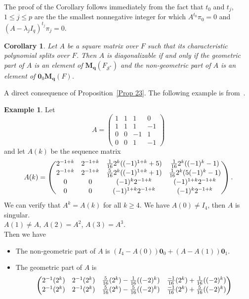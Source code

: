 \documentclass[12pt]{amsart}
\newtheorem{cor}[thrm]{Corollary}
\theoremstyle{definition}
\newtheorem{example}[thrm]{Example}
\numberwithin{equation}{section}
\numberwithin{equation}{section}
\begin{document}
\proof
The proof of the Corollary follows immediately from the fact that $t_{0}$ and $t_{j}$, $1\leq j \leq p$ are the the smallest nonnegative integer for which $A^{t_{0}}\pi_{0}=0$ and $(A-\lambda_{j}I_{q})^{t_{j}}\pi_{j}=0$.
\endproof
\begin{cor}\label{Cor 23} Let $A$ be a square matrix over $F$ such that its characteristic polynomial splits over $F$. Then $A$ is diagonalizable if and only if the geometric part of $A$ is an element of $\mathbf{M_{q}}(F_{\mathcal{S}^{\ast}})$ and the non-geometric part of $A$ is an element of $\pmb{0}_{0}\mathbf{M_{q}}(F)$.
\end{cor}
\proof A direct consequence of Proposition~\ref{Prop 23}.
\endproof
The following example is from~\cite{Male}.
\begin{example}\label{example 1}
Let $$A=\begin{pmatrix}
1&1&1&0\\1&1&1&-1\\0&0&-1&1\\0&0&1&-1
\end{pmatrix}$$
and let $A(k)$ be the sequence matrix
$$A(k)=\begin{pmatrix}
2^{-1+k}&2^{-1+k}&\frac{1}{16}2^{k}((-1)^{1+k}+5)&\frac{1}{16}2^{k}((-1)^{k}-1)\vspace*{0.1pc}\\
2^{-1+k}&2^{-1+k}&\frac{5}{16}2^{k}((-1)^{1+k}+1)&\frac{1}{16}2^{k}(5(-1)^{k}-1)\vspace*{0.1pc}\\
0&0&(-1)^{k}2^{-1+k}&(-1)^{1+k}2^{-1+k}\vspace*{0.1pc}\\
0&0&(-1)^{1+k}2^{-1+k}&(-1)^{k}2^{-1+k}
\end{pmatrix}.$$
We can verify that $A^{k}=A(k)$ for all $k\geq 4$. We have $A(0)\neq I_{4}$, then $A$ is singular.
\\$A(1)\neq A$, $A(2)=A^{2}$, $A(3)=A^{3}$.
\\Then we have
\begin{itemize}
\item The non-geometric part of $A$ is $(I_{4}-A(0))\pmb{0}_{0}+(A-A(1))\pmb{0}_{1}$.
\item The geometric part of $A$ is
$$\begin{pmatrix}
2^{-1}(2^{k})&2^{-1}(2^{k})&\frac{5}{16}(2^{k})-\frac{1}{16}((-2)^{k})&\frac{-1}{16}(2^{k})+\frac{1}{16}((-2)^{k})\vspace*{0.1pc}\\
2^{-1}(2^{k})&2^{-1}(2^{k})&\frac{5}{16}(2^{k})-\frac{5}{16}((-2)^{k})&\frac{-1}{16}(2^{k})+\frac{5}{16}((-2)^{k})\vspace*{0.1pc}\\

\end{pmatrix}$$
\end{itemize}
\end{example}
\end{document}
